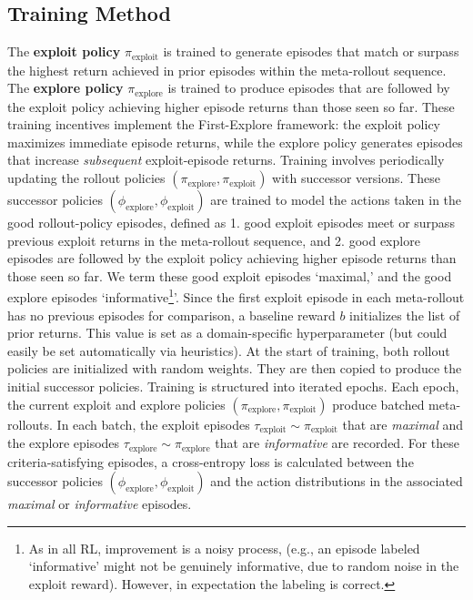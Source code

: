 \documentclass{article}
\begin{document}
\subsection{Training Method}
The \textbf{exploit policy} \(\pi_{\text{exploit}}\) is
trained to generate episodes that match or surpass the highest return achieved in prior episodes within the meta-rollout sequence.
The \textbf{explore policy} \(\pi_{\text{explore}}\) is trained to produce episodes that are followed by the exploit policy achieving higher episode returns than those seen so far.
These training incentives implement the First-Explore framework: the exploit policy maximizes immediate episode returns, while the explore policy generates episodes that increase \emph{subsequent} exploit-episode returns.
Training involves periodically updating the rollout policies \((\pi_{\text{explore}}, \pi_{\text{exploit}})\) with successor versions. These successor policies \((\phi_{\text{explore}},
\phi_{\text{exploit}})\) are trained to model the actions taken in the good rollout-policy episodes, defined as 1. good exploit episodes meet or surpass previous exploit returns in the meta-rollout sequence, and 2. good explore episodes are followed by the exploit policy achieving higher episode returns than those seen so far. We term these good exploit episodes `maximal,' and the good explore episodes `informative\footnote{As in all RL, improvement is a noisy process, (e.g., an episode labeled `informative' might not be genuinely informative, due to random noise in the exploit reward). However, in expectation the labeling is correct.}'. Since the first exploit episode in each meta-rollout has no previous episodes for comparison, a baseline reward \(b\) initializes the list of prior returns. This value is set as a domain-specific hyperparameter (but could easily be set automatically via heuristics).
At the start of training, both rollout policies are initialized with random weights. They are then copied to produce the initial successor policies.
Training is structured into iterated epochs. Each epoch, the current exploit and explore policies \((\pi_{\text{explore}}, \pi_{\text{exploit}})\) produce batched meta-rollouts. In each batch, the exploit episodes \(\tau_{\text{exploit}} \sim \pi_{\text{exploit}}\) that are \emph{maximal} and the explore episodes \(\tau_{\text{explore}} \sim \pi_{\text{explore}}\) that are \emph{informative} are recorded.
For these criteria-satisfying episodes, a cross-entropy loss is calculated between the successor policies \((\phi_{\text{explore}}, \phi_{\text{exploit}})\) and the action distributions in the associated \emph{maximal} or \emph{informative} episodes.
\end{document}

